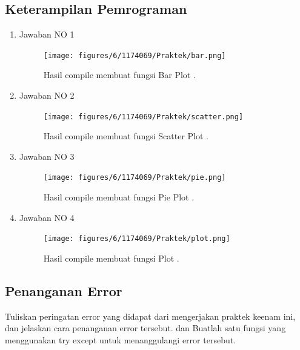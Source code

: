 \subsection{Keterampilan Pemrograman}
\begin{enumerate}
\item Jawaban NO 1


\begin{figure}[H]
	\texttt{[image: figures/6/1174069/Praktek/bar.png]}
	\centering
	\caption{Hasil compile membuat fungsi Bar Plot .}
\end{figure}

\item Jawaban NO 2


\begin{figure}[H]
	\texttt{[image: figures/6/1174069/Praktek/scatter.png]}
	\centering
	\caption{Hasil compile membuat fungsi Scatter Plot .}
\end{figure}

\item Jawaban NO 3


\begin{figure}[H]
	\texttt{[image: figures/6/1174069/Praktek/pie.png]}
	\centering
	\caption{Hasil compile membuat fungsi Pie Plot .}
\end{figure}

\item Jawaban NO 4


\begin{figure}[H]
	\texttt{[image: figures/6/1174069/Praktek/plot.png]}
	\centering
	\caption{Hasil compile membuat fungsi Plot .}
\end{figure}

\end{enumerate}

\subsection{Penanganan Error}
Tuliskan  peringatan  error  yang  didapat  dari  mengerjakan  praktek  keenam  ini, dan  jelaskan  cara  penanganan  error  tersebut. dan  Buatlah  satu  fungsi  yang menggunakan try except untuk menanggulangi error tersebut.

